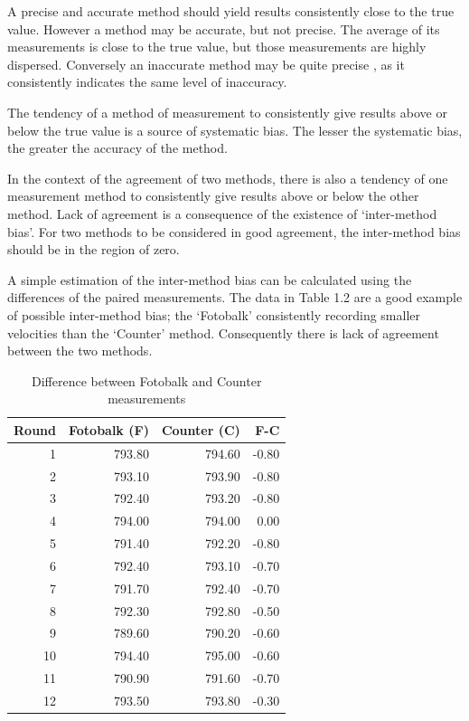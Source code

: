 \documentclass[12pt, a4paper]{report}
\theoremstyle{plain}
\theoremstyle{definition}
\theoremstyle{remark}
\begin{document}
	\newpage
	
	A precise and accurate method should yield results consistently
	close to the true value. However a method may be accurate, but not
	precise. The average of its measurements is close to the true
	value, but those measurements are highly dispersed. Conversely an
	inaccurate method may be quite precise , as it consistently
	indicates the same level of inaccuracy.
	
	The tendency of a method of measurement to consistently give
	results above or below the true value is a source of systematic
	bias. The lesser the systematic bias, the greater the accuracy of
	the method.
	
	In the context of the agreement of two methods, there is also a
	tendency of one measurement method to consistently give results
	above or below the other method. Lack of agreement is a
	consequence of the existence of `inter-method bias'. For two
	methods to be considered in good agreement, the inter-method bias
	should be in the region of zero.
	
	A simple estimation of the inter-method bias can be calculated
	using the differences of the paired measurements. The data in
	Table 1.2 are a good example of possible inter-method bias; the
	`Fotobalk' consistently recording smaller velocities than the
	`Counter' method. Consequently there is lack of agreement between
	the two methods.
	\newpage
	\begin{table}[h!]
		\begin{center}
			
			\begin{tabular}{rrrr}
				\hline
				Round& Fotobalk (F) & Counter (C) & F-C \\
				\hline
				1 & 793.80 & 794.60 & -0.80 \\
				2 & 793.10 & 793.90 & -0.80 \\
				3 & 792.40 & 793.20 & -0.80 \\
				4 & 794.00 & 794.00 & 0.00 \\
				5 & 791.40 & 792.20 & -0.80 \\
				6 & 792.40 & 793.10 & -0.70 \\
				7 & 791.70 & 792.40 & -0.70 \\
				8 & 792.30 & 792.80 & -0.50 \\
				9 & 789.60 & 790.20 & -0.60 \\
				10 & 794.40 & 795.00 & -0.60 \\
				11 & 790.90 & 791.60 & -0.70 \\
				12 & 793.50 & 793.80 & -0.30 \\
				\hline
			\end{tabular}
			\caption{Difference between Fotobalk and Counter measurements}
		\end{center}
	\end{table}
	
\end{document}

